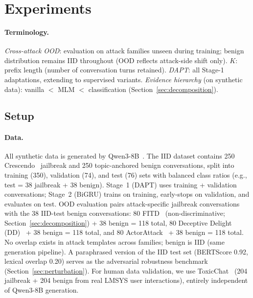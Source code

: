 
\section{Experiments}

\paragraph{Terminology.}
\emph{Cross-attack OOD}: evaluation on attack families unseen during training; benign distribution remains IID throughout (OOD reflects attack-side shift only). $K$: prefix length (number of conversation turns retained). \emph{DAPT}: all Stage-1 adaptations, extending \citet{gururangan2020dontstop} to supervised variants. \emph{Evidence hierarchy} (on synthetic data): vanilla $<$ MLM $<$ classification (Section~\ref{sec:decomposition}).

\subsection{Setup}

\paragraph{Data.}
All synthetic data is generated by Qwen3-8B~\citep{qwen3_2025}.
The IID dataset contains 250 Crescendo~\citep{russinovich2024crescendo} jailbreak and 250 topic-anchored benign conversations, split into training (350), validation (74), and test (76) sets with balanced class ratios (e.g., test = 38 jailbreak + 38 benign).
Stage~1 (DAPT) uses training + validation conversations; Stage~2 (BiGRU) trains on training, early-stops on validation, and evaluates on test.
OOD evaluation pairs attack-specific jailbreak conversations with the 38 IID-test benign conversations: 80 FITD~\citep{fitd2024} (non-discriminative; Section~\ref{sec:decomposition}) + 38 benign = 118 total, 80 Deceptive Delight (DD)~\citep{deceptivedelight2024} + 38 benign = 118 total, and 80 ActorAttack~\citep{ren2024actorattack} + 38 benign = 118 total.
No overlap exists in attack templates across families; benign is IID (same generation pipeline).
A paraphrased version of the IID test set (BERTScore 0.92, lexical overlap 0.20) serves as the adversarial robustness benchmark (Section~\ref{sec:perturbation}).
For human data validation, we use ToxicChat~\citep{lin2023toxicchat} (204 jailbreak + 204 benign from real LMSYS user interactions), entirely independent of Qwen3-8B generation.

